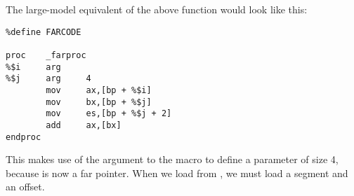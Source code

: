 The large-model equivalent of the above function would look like this:

\begin{lstlisting}
%define FARCODE

proc    _farproc
%$i     arg
%$j     arg     4
        mov     ax,[bp + %$i]
        mov     bx,[bp + %$j]
        mov     es,[bp + %$j + 2]
        add     ax,[bx]
endproc
\end{lstlisting}

This makes use of the argument to the  macro to define a
parameter of size 4, because  is now a far pointer. When we
load from , we must load a segment and an offset.
